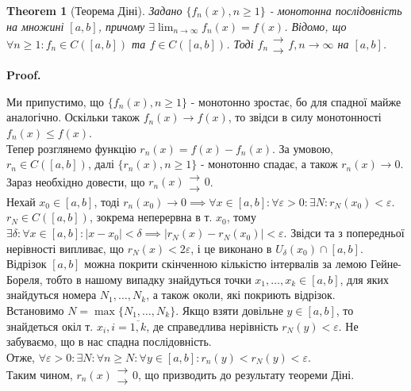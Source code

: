 \documentclass[a4paper, 10pt]{article}
\makeatletter
\def\huge{\displaystyle}
\def\qed{$\blacksquare$}
\theoremstyle{theoremdd}
\newtheorem{theorem}{Theorem}[subsection]
\theoremstyle{theoremdd}
\theoremstyle{theoremdd}
\theoremstyle{theoremdd}
\theoremstyle{theoremdd}
\newtheorem{example}[theorem]{Example}
\theoremstyle{theoremdd}
\theoremstyle{theoremdd}
\theoremstyle{theoremdd}
\theoremstyle{theoremdd}
\renewenvironment{proof}[1][Proof.\\]{\par
\pushQED{\hfill \qed}%
\normalfont \topsep6\p@\@plus6\p@\relax
\trivlist
\item\relax
{\bfseries
#1\@addpunct{.}}\hspace\labelsep\ignorespaces
}{%
\popQED\endtrivlist\@endpefalse
}
\makeatother
\begin{document}
\begin{theorem}[Теорема Діні]
Задано $\{ f_n(x), n \geq 1 \}$ - монотонна послідовність на множині $[a,b]$, причому $\exists \huge\lim_{n \to \infty} f_n(x) = f(x)$. Відомо, що $\forall n \geq 1: f_n \in C([a,b])$ та $f \in C([a,b])$. Тоді $f_n \substack{\rightarrow \\ \rightarrow} f, n \to \infty$ на $[a,b]$.
\end{theorem}

\begin{proof}
Ми припустимо, що $\{ f_n(x), n \geq 1 \}$ - монотонно зростає, бо для спадної майже аналогічно. Оскільки також $f_n(x) \to f(x)$, то звідси в силу монотонності $f_n(x) \leq f(x)$.\\
Тепер розглянемо функцію $r_n(x) = f(x) - f_n(x)$. За умовою, $r_n \in C([a,b])$, далі $\{r_n(x), n \geq 1\}$ - монотонно спадає, а також $r_n(x) \to 0$. Зараз необхідно довести, що $r_n(x) \substack{\rightarrow \\ \rightarrow} 0$.\\
Нехай $x_0 \in [a,b]$, тоді $r_n(x_0) \to 0 \implies \forall x \in [a,b]: \forall \varepsilon > 0: \exists N: r_N(x_0) < \varepsilon$.
$r_N \in C([a,b])$, зокрема неперервна в т. $x_0$, тому $\exists \delta: \forall x \in [a,b]: |x-x_0| < \delta \implies |r_N(x) - r_N(x_0)| < \varepsilon$. Звідси та з попередньої нерівності випливає, що $r_N(x) < 2\varepsilon$, і це виконано в $U_{\delta} (x_0) \cap [a,b]$.\\
Відрізок $[a,b]$ можна покрити скінченною кількістю інтервалів за лемою Гейне-Бореля, тобто в нашому випадку знайдуться точки $x_1,\dots,x_k \in [a,b]$, для яких знайдуться номера $N_1,\dots,N_k$, а також околи, які покриють відрізок.\\
Встановимо $N = \max \{N_1,\dots,N_k\}$. Якщо взяти довільне $y \in [a,b]$, то знайдеться окіл т. $x_i, i = \overline{1,k}$, де справедлива нерівність $r_N(y) < \varepsilon$. Не забуваємо, що в нас спадна послідовність.\\
Отже, $\forall \varepsilon > 0: \exists N: \forall n \geq N: \forall y \in [a,b]: r_n(y) < r_N(y) < \varepsilon$.\\
Таким чином, $r_n(x) \substack{\rightarrow \\ \rightarrow} 0$, що призводить до результату теореми Діні.
\end{proof}

\end{document}
